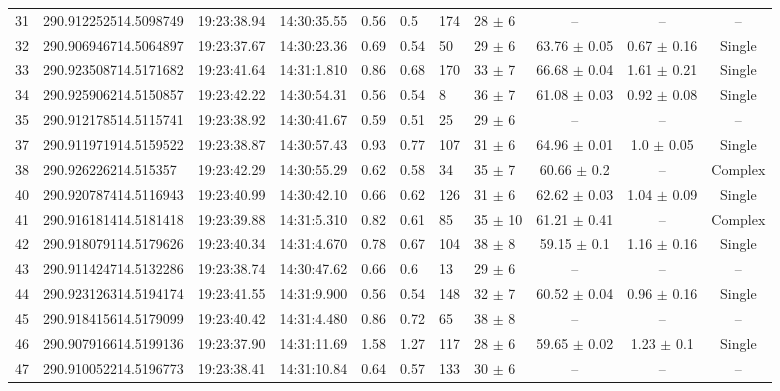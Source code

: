 \begin{table}[htbp!]
\begin{tabular}{llllllllccc}
31  &  290.912252514.5098749  &  19:23:38.94  &  14:30:35.55  &  0.56  &  0.5  &  174  &  28 $\pm$ 6  &  --  &  --  &  -- \\
32  &  290.906946714.5064897  &  19:23:37.67  &  14:30:23.36  &  0.69  &  0.54  &  50  &  29 $\pm$ 6  &  63.76 $\pm$ 0.05  &  0.67 $\pm$ 0.16  &  Single \\
33  &  290.923508714.5171682  &  19:23:41.64  &  14:31:1.810  &  0.86  &  0.68  &  170  &  33 $\pm$ 7  &  66.68 $\pm$ 0.04  &  1.61 $\pm$ 0.21  &  Single \\
34  &  290.925906214.5150857  &  19:23:42.22  &  14:30:54.31  &  0.56  &  0.54  &  8  &  36 $\pm$ 7  &  61.08 $\pm$ 0.03  &  0.92 $\pm$ 0.08  &  Single \\
35  &  290.912178514.5115741  &  19:23:38.92  &  14:30:41.67  &  0.59  &  0.51  &  25  &  29 $\pm$ 6  &  --  &  --  &  -- \\
37  &  290.911971914.5159522  &  19:23:38.87  &  14:30:57.43  &  0.93  &  0.77  &  107  &  31 $\pm$ 6  &  64.96 $\pm$ 0.01  &  1.0 $\pm$ 0.05  &  Single \\
38  &  290.926226214.515357  &  19:23:42.29  &  14:30:55.29  &  0.62  &  0.58  &  34  &  35 $\pm$ 7  &  60.66 $\pm$ 0.2  &  --  &  Complex \\
40  &  290.920787414.5116943  &  19:23:40.99  &  14:30:42.10  &  0.66  &  0.62  &  126  &  31 $\pm$ 6  &  62.62 $\pm$ 0.03  &  1.04 $\pm$ 0.09  &  Single \\
41  &  290.916181414.5181418  &  19:23:39.88  &  14:31:5.310  &  0.82  &  0.61  &  85  &  35 $\pm$ 10  &  61.21 $\pm$ 0.41  &  --  &  Complex \\
42  &  290.918079114.5179626  &  19:23:40.34  &  14:31:4.670  &  0.78  &  0.67  &  104  &  38 $\pm$ 8  &  59.15 $\pm$ 0.1  &  1.16 $\pm$ 0.16  &  Single \\
43  &  290.911424714.5132286  &  19:23:38.74  &  14:30:47.62  &  0.66  &  0.6  &  13  &  29 $\pm$ 6  &  --  &  --  &  -- \\
44  &  290.923126314.5194174  &  19:23:41.55  &  14:31:9.900  &  0.56  &  0.54  &  148  &  32 $\pm$ 7  &  60.52 $\pm$ 0.04  &  0.96 $\pm$ 0.16  &  Single \\
45  &  290.918415614.5179099  &  19:23:40.42  &  14:31:4.480  &  0.86  &  0.72  &  65  &  38 $\pm$ 8  &  --  &  --  &  -- \\
46  &  290.907916614.5199136  &  19:23:37.90  &  14:31:11.69  &  1.58  &  1.27  &  117  &  28 $\pm$ 6  &  59.65 $\pm$ 0.02  &  1.23 $\pm$ 0.1  &  Single \\
47  &  290.910052214.5196773  &  19:23:38.41  &  14:31:10.84  &  0.64  &  0.57  &  133  &  30 $\pm$ 6  &  --  &  --  &  -- \\

\end{tabular}
\end{table}
